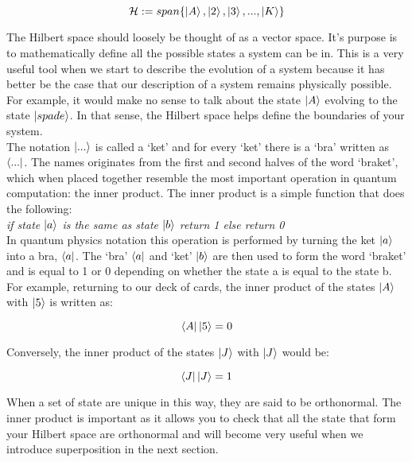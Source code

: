 \begin{equation}
\mathcal{H}:=span\{\left\vert{A}\right\rangle, \left\vert{2}\right\rangle, \left\vert{3}\right\rangle,...,\left\vert{K}\right\rangle\}
\end{equation}

The Hilbert space should loosely be thought of as a vector space. It's purpose is to mathematically define all the possible states a system can be in. This is a very useful tool when we start to describe the evolution of a system because it has better be the case that our description of a system remains physically possible. For example, it would make no sense to talk about the state $\left\vert{A}\right\rangle$ evolving to the state $\left\vert{spade}\right\rangle$. In that sense, the Hilbert space helps define the boundaries of your system.\\

The notation $\left\vert{...}\right\rangle$ is called a `ket' and for every `ket' there is a `bra' written as $\left\langle{...}\right\vert$. The names originates from the first and second halves of the word `braket', which when placed together resemble the most important operation in quantum computation: the inner product. The inner product is a simple function that does the following:\\

\textit{if state $\left\vert{a}\right\rangle$ is the same as state $\left\vert{b}\right\rangle$ return 1 else return 0}\\

In quantum physics notation this operation is performed by turning the ket $\left\vert{a}\right\rangle$ into a bra, $\left\langle{a}\right\vert$. The `bra' $\left\langle{a}\right\vert$ and `ket' $\left\vert{b}\right\rangle$ are then used to form the word `braket' and is equal to 1 or 0 depending on whether the state a is equal to the state b.\\

For example, returning to our deck of cards, the inner product of the states $\left\vert{A}\right\rangle$ with $\left\vert{5}\right\rangle$ is written as:

\begin{equation}
\left\langle{A}\right\vert\left\vert{5}\right\rangle = 0
\end{equation}

Conversely, the inner product of the states $\left\vert{J}\right\rangle$ with $\left\vert{J}\right\rangle$ would be:

\begin{equation}
\left\langle{J}\right\vert\left\vert{J}\right\rangle = 1
\end{equation}

When a set of state are unique in this way, they are said to be orthonormal. The inner product is important as it allows you to check that all the state that form your Hilbert space are orthonormal and will become very useful when we introduce superposition in the next section.

